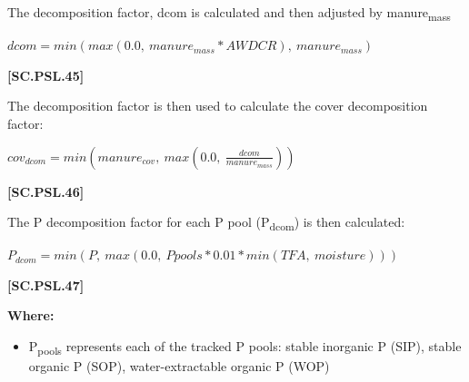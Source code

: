 The decomposition factor, dcom is calculated and then adjusted by manure\textsubscript{mass}
            \vspace{0.5cm}
        
    \begin{center}
\(dcom = min(max(0.0,\ manure_{mass} * AWDCR),\ manure_{mass})   \)
    \end{center}
        \vspace{0.5cm} 
    
            {\raggedleft \textbf{[SC.PSL.45]}\par}
            \vspace{0.5cm}

The decomposition factor is then used to calculate the cover decomposition factor:
            \vspace{0.5cm}
        
    \begin{center}
\(cov_{dcom} = min(manure_{cov},\ max(0.0,\ \frac{dcom}{manure_{mass}}))  \)
    \end{center}
        \vspace{0.5cm} 
    
            {\raggedleft \textbf{[SC.PSL.46]}\par}
            \vspace{0.5cm}

The P decomposition factor for each P pool (P\textsubscript{dcom}) is then calculated:
            \vspace{0.5cm}
        
    \begin{center}
\(P_{dcom} = min(P,\ max(0.0,\ Ppools * 0.01 * min(TFA,\ moisture))) \)
    \end{center}
        \vspace{0.5cm} 
    
            {\raggedleft \textbf{[SC.PSL.47]}\par}
            \vspace{0.5cm}

        \textbf{Where:}
            
        \begin{itemize}
            \item P\textsubscript{pools} represents each of the tracked P pools: stable inorganic P (SIP), stable organic P (SOP), water-extractable organic P (WOP)
        \end{itemize}
        \vspace{0.5cm}

